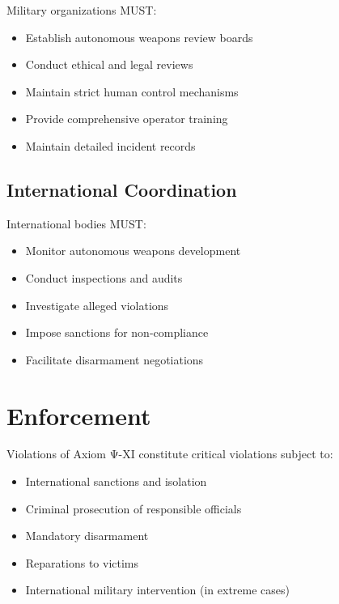 Military organizations MUST:

\begin{itemize}
    \item Establish autonomous weapons review boards
    \item Conduct ethical and legal reviews
    \item Maintain strict human control mechanisms
    \item Provide comprehensive operator training
    \item Maintain detailed incident records
\end{itemize}

\subsection{International Coordination}

International bodies MUST:

\begin{itemize}
    \item Monitor autonomous weapons development
    \item Conduct inspections and audits
    \item Investigate alleged violations
    \item Impose sanctions for non-compliance
    \item Facilitate disarmament negotiations
\end{itemize}

\vspace{0.5cm}

\section{Enforcement}

Violations of Axiom Ψ-XI constitute critical violations subject to:

\begin{itemize}
    \item International sanctions and isolation
    \item Criminal prosecution of responsible officials
    \item Mandatory disarmament
    \item Reparations to victims
    \item International military intervention (in extreme cases)
\end{itemize}

\vspace{0.5cm}

